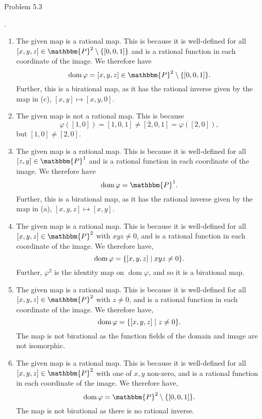\documentclass[12pt]{article}
\begin{document}
\begin{prob}
    Problem 5.3
\end{prob}

\sol.
\begin{enumerate}[label = (\alph*)]
    \item The given map is a rational map. This is because it is well-defined for all \( [x,y,z] \in \mathbbm{P}^2 \setminus \qty{[0,0,1]} \) and is a rational function in each coordinate of the image. We therefore have
          \[
              \operatorname{dom} \varphi =[x,y,z] \in \mathbbm{P}^2 \setminus \qty{[0,0,1]}.
          \]
          Further, this is a birational map, as it has the rational inverse given by the map in (c), \( [x,y] \mapsto [x,y,0] \).
          \smallskip
    \item The given map is not a rational map. This is because
          \[
              \varphi([1,0]) = [1,0,1] \neq [2,0,1] = \varphi([2,0]),
          \]
          but \( [1,0] \neq [2,0] \).
          \smallskip

    \item The given map is a rational map. This is because it is well-defined for all \( [z,y] \in \mathbbm{P}^1 \) and is a rational function in each coordinate of the image. We therefore have
          \[
              \operatorname{dom} \varphi = \mathbbm{P}^1.
          \]
          Further, this is a birational map, as it has the rational inverse given by the map in (a), \( [x,y,z] \mapsto [x,y] \).
          \smallskip

    \item The given map is a rational map. This is because it is well-defined for all \( [x,y,z] \in \mathbbm{P}^2 \) with \( xyz \neq 0 \), and is a rational function in each coordinate of the image. We therefore have,
          \[
              \operatorname{dom}  \varphi = \qty{[x,y,z] \mid xyz \neq 0}.
          \]
          Further, \( \varphi^2 \) is the identity map on \( \operatorname{dom} \varphi \), and so it is a birational map.
          \smallskip

    \item The given map is a rational map. This is because it is well-defined for all \( [x,y,z] \in \mathbbm{P}^2 \) with \( z \neq 0 \), and is a rational function in each coordinate of the image. We therefore have,
          \[
              \operatorname{dom} \varphi = \qty{[x,y,z] \mid z \neq 0}.
          \]
          The map is not birational as the function fields of the domain and image are not isomorphic.
          \smallskip

    \item The given map is a rational map. This is because it is well-defined for all \( [x,y,z] \in \mathbbm{P}^2 \) with one of \( x,y \) non-zero, and is a rational function in each coordinate of the image. We therefore have,
          \[
              \operatorname{dom} \varphi = \mathbbm{P}^2 \setminus \qty{[0,0,1]}.
          \]
          The map is not birational as there is no rational inverse.
\end{enumerate}
\end{document}
